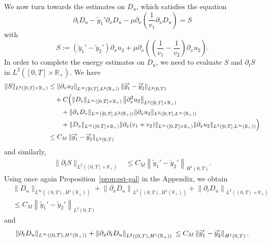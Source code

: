 \documentclass[AHL,Unicode,longabstracts,published]{cedram}
\newcommand{\R}{\mathbb{R}}
\newcommand{\p}{\partial}
\newcommand{\ty}{\widetilde{y}}
\newcommand{\dv}{D_v}
\newcommand{\du}{D_u}
\begin{document}
We now turn towards the estimates on $\du$, which satisfies the equation
\[
\p_t \du - \ty_1'\p_x \du -\mu \p_x \left(\frac{1}{v_1}\p_x \du\right)= S
\]
with
\[
S:=\left(\ty_1'-\ty_2'\right)\p_x u_2 + \mu \p_x \left(\left(\frac{1}{v_1}- \frac{1}{v_2}\right) \p_x u_2\right).
\]
In order to complete the energy estimates on $\du$, we need to evaluate $S$ and $\p_t S$ in $L^2([0,T]\times \R_+)$. We have
\begin{align*}
\|S\|_{L^2\left([0,T]\times \R_+\right)} &\leq \left\|\p_x u_2\right\|_{L^\infty \left([0,T],L^2(\R_+)\right)}\left\|\ty_1'-\ty_2'\right\|_{L^2(0,T)}\\
&\quad + C \Big(\|\dv\|_{L^\infty\left([0,T]\times \R_+\right)}\left\|\p_{x}^2 u_2\right\|_{L^2\left([0,T]\times \R_+\right)} \\
& \hskip7mm+ \|\partial_x\dv\|_{L^\infty([0,T],L^2(\R_+))}\|\p_x u_2\|_{L^2([0,T],L^\infty(\R_+))} \\
& \hskip7mm + \|\dv\|_{L^\infty([0,T]\times \R_+)} \|\partial_x(v_1 + v_2)\|_{L^\infty([0,T]\times \R_+)} \|\p_x u_2\|_{L^2([0,T],L^\infty(\R_+))}\Big) \\
&\leq C_M \left\|\ty_1'-\ty_2'\right\|_{L^2(0,T)}
\end{align*}
and similarly,
\begin{align*}
\|\p_t S\|_{L^2([0,T]\times \R_+)} &\leq C_M \left\|\ty_1'-\ty_2'\right\|_{H^1(0,T)}.
\end{align*}
Using once again Proposition~\ref{prop:est-gal} in the Appendix, we obtain
\begin{align*}
&\|\du\|_{L^\infty\left((0,T), H^1(\R_+)\right)} + \left\|\p_x \du\right\|_{L^2\left((0,T),H^1(\R_+)\right)} + \left\|\p_t \du\right\|_{L^2\left((0,T)\times \R_+\right)}\\
& \leq C_M \left\|\ty_1'-\ty_2'\right\|_{L^2(0,T)}
\end{align*}
and
\[
\|\p_t \du\|_{L^\infty\left((0,T), H^1(\R_+)\right)} + \left\|\p_x\p_t \du\right\|_{L^2\left((0,T), H^1(\R_+)\right)}\\
\leq C_M \left\|\ty_1'-\ty_2'\right\|_{H^1(0,T)}.
\]
\end{document}
